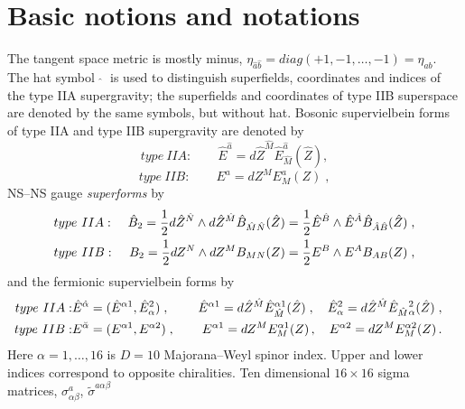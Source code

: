 \documentclass[a4paper,11pt]{article}
\begin{document}
\section{Basic notions and notations}

The tangent space metric is mostly minus, 
$\eta_{\hat{a}\hat{b}}= diag (+1,-1,\ldots , -1) = \eta_{ab}$. 
The hat symbol 
$\;\hat{}\;$ is used to distinguish  superfields, coordinates and indices of   
the type IIA supergravity; 
the superfields and coordinates  
of type IIB superspace are denoted by the same symbols, but without hat. 
Bosonic supervielbein forms of type IIA and type IIB supergravity are 
denoted by 
\begin{equation}
\label{bEIIA}
type ~IIA: \qquad 
\hat{E}^{ {\hat{a}}}= d\hat{Z}^{ {\hat{M}}}
\hat{E}_{ {\hat{M}}}^{ {\hat{a}}}(\hat{Z}),
\end{equation}
\begin{equation}\label{bEIIB}
type ~IIB: \qquad 
E^{ {a}}= dZ^{ {M}} E_{ {M}}^{ {a}}(Z)\; , 
\end{equation}
NS--NS gauge {\sl superforms} by   
\begin{eqnarray}
\label{0B2IIA}
& type ~IIA: \; & \hat{B}_2
={1\over 2}
d\hat{Z}^{\hat{ {N}}} \wedge
d\hat{Z}^{\hat{ {M}}}
\hat{B}_{\hat{ {M}}\hat{ {N}}}(\hat{Z})
={1\over 2}
\hat{E}^{\hat{ {B}}} \wedge
\hat{E}^{\hat{ {A}}}
\hat{B}_{\hat{ {A}}\hat{ {B}}}(\hat{Z})\; , 
\\ \label{0B2IIB}
& type ~IIB: \; & B_2
={1\over 2}
dZ^{ {N}} \wedge
dZ^{ {M}}B_{ {M} {N}}(Z)
={1\over 2}
E^{ {B}} \wedge
E^{ {A}}B_{ {A} {B}}(Z)\; , 
\end{eqnarray} 
and the fermionic supervielbein forms by   
\begin{eqnarray}
\label{fEIIA}
type ~IIA: &  
\hat{E}^{ {\hat{\alpha}}}=
(\hat{E}^{ {\alpha}1}, \hat{E}^2_{ {\alpha}})\; , 
  \quad &  \hat{E}^{ {\alpha}1}=  d\hat{Z}^{ {\hat{M}}}
\hat{E}_{ {\hat{M}}}^{ {\alpha}1}(\hat{Z})\; , 
\quad \hat{E}^2_{ {\alpha}}
=  d\hat{Z}^{ {\hat{M}}}
\hat{E}_{ {\hat{M}}}{}^2_{ {\alpha}}(\hat{Z}) \; , \quad 
\\ 
\label{fEIIB}
 type ~IIB:  &  
E^{ {\breve{\alpha}}}= (E^{ {\alpha}1}, E^{ {\alpha}2}) \; , 
\quad & 
E^{ {\alpha}1}= dZ^{ {M}} E_{ {M}}^{ {\alpha}1}
(Z)\, ,  \quad 
E^{ {\alpha}2}= dZ^{ {M}} E_{ {M}}^{ {\alpha}2}(Z)
\, .  \quad 
\end{eqnarray}
Here $\alpha = 1, \ldots , 16$ is $D=10$ Majorana--Weyl spinor index. 
Upper and lower indices correspond to opposite  chiralities. 
Ten dimensional $16\times 16$ sigma matrices, 
$\sigma_{\alpha\beta}^{a}$, $\tilde{\sigma}^{a\alpha\beta}$ 
\end{document}
